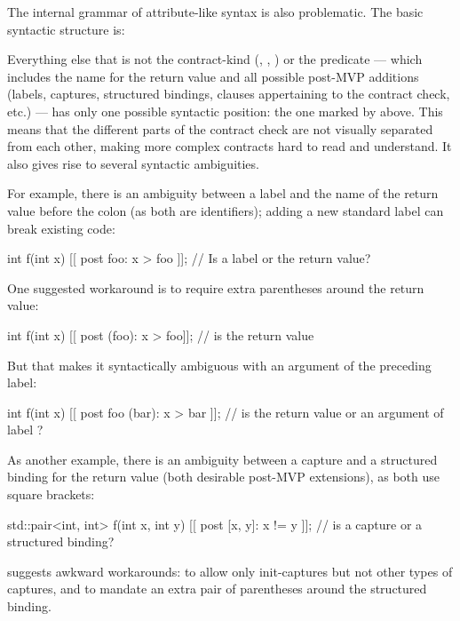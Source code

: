 The internal grammar of attribute-like syntax is also problematic. The basic syntactic structure is:

\phantom{~~~}

Everything else that is not the contract-kind (, , ) or the predicate --- which includes the name for the return value and all possible post-MVP additions (labels, captures, structured bindings,  clauses appertaining to the contract check, etc.) --- has only one possible syntactic position: the one marked by \tcode{***} above.  This means that the different parts of the contract check are not visually separated from each other, making more complex contracts hard to read and understand. It also gives rise to several syntactic ambiguities.

For example, there is an ambiguity between a label and the name of the return value before the colon (as both are identifiers); adding a new standard label can break existing code:

\begin{codeblock}
int f(int x)
  [[ post foo: x > foo ]];   // Is  a label or the return value?
\end{codeblock}

One suggested workaround is to require extra parentheses around the return value:

\begin{codeblock}
int f(int x)
  [[ post (foo): x > foo]];   //  is the return value
\end{codeblock}


But that makes it syntactically ambiguous with an argument of the preceding label:
\begin{codeblock}
int f(int x)
  [[ post foo (bar): x > bar ]];   // is  the return value or an argument of label ?
\end{codeblock}

 As another example, there is an ambiguity between a capture and a structured binding for the return value (both desirable post-MVP extensions), as both use square brackets:
 
\begin{codeblock}
std::pair<int, int> f(int x, int y)
  [[ post [x, y]: x != y ]];   // is \tcode{[x, y]} a capture or a structured binding?
\end{codeblock}
 
\cite{P2935R3} suggests awkward workarounds:  to allow only init-captures but not other types of captures, and to mandate an extra pair of parentheses around the structured binding. 

